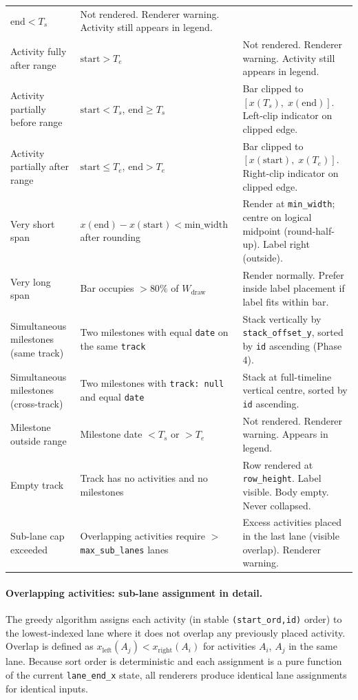 \begin{longtable}{@{}p{3.2cm}p{3.4cm}p{5.8cm}@{}}
  $\text{end} < T_s$ &
  Not rendered. Renderer warning. Activity still appears in legend. \\[4pt]
Activity fully after range &
  $\text{start} > T_e$ &
  Not rendered. Renderer warning. Activity still appears in legend. \\[4pt]
Activity partially before range &
  $\text{start} < T_s$, $\text{end} \geq T_s$ &
  Bar clipped to $[x(T_s),\;x(\text{end})]$. Left-clip indicator on clipped edge. \\[4pt]
Activity partially after range &
  $\text{start} \leq T_e$, $\text{end} > T_e$ &
  Bar clipped to $[x(\text{start}),\;x(T_e)]$. Right-clip indicator on clipped edge. \\[4pt]
Very short span &
  $x(\text{end}) - x(\text{start}) < \text{min\_width}$ after rounding &
  Render at \texttt{min\_width}; centre on logical midpoint (round-half-up). Label right (outside). \\[4pt]
Very long span &
  Bar occupies $> 80\%$ of $W_{\mathrm{draw}}$ &
  Render normally. Prefer inside label placement if label fits within bar. \\[4pt]
Simultaneous milestones (same track) &
  Two milestones with equal \texttt{date} on the same \texttt{track} &
  Stack vertically by \texttt{stack\_offset\_y}, sorted by \texttt{id} ascending (Phase 4). \\[4pt]
Simultaneous milestones (cross-track) &
  Two milestones with \texttt{track: null} and equal \texttt{date} &
  Stack at full-timeline vertical centre, sorted by \texttt{id} ascending. \\[4pt]
Milestone outside range &
  Milestone date $< T_s$ or $> T_e$ &
  Not rendered. Renderer warning. Appears in legend. \\[4pt]
Empty track &
  Track has no activities and no milestones &
  Row rendered at \texttt{row\_height}. Label visible. Body empty. Never collapsed. \\[4pt]
Sub-lane cap exceeded &
  Overlapping activities require $>$ \texttt{max\_sub\_lanes} lanes &
  Excess activities placed in the last lane (visible overlap). Renderer warning. \\
\end{longtable}

\paragraph{Overlapping activities: sub-lane assignment in detail.}

The greedy algorithm assigns each activity (in stable \texttt{(start\_ord,\;id)} order) to the
lowest-indexed lane where it does not overlap any previously placed activity. Overlap is
defined as $x_{\text{left}}(A_j) < x_{\text{right}}(A_i)$ for activities $A_i$, $A_j$ in
the same lane. Because sort order is deterministic and each assignment is a pure function of
the current \texttt{lane\_end\_x} state, all renderers produce identical lane assignments
for identical inputs.

